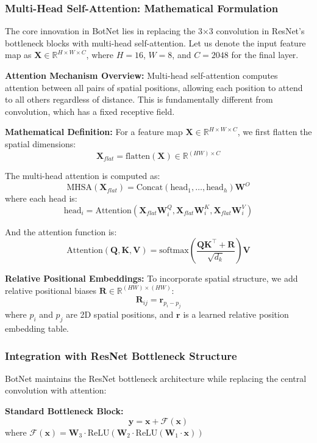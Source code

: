 \documentclass[a4paper,12pt]{article}
\begin{document}
\subsubsection{Multi-Head Self-Attention: Mathematical Formulation}

The core innovation in BotNet lies in replacing the 3×3 convolution in ResNet's bottleneck blocks with multi-head self-attention. Let us denote the input feature map as $\mathbf{X} \in \mathbb{R}^{H \times W \times C}$, where $H=16$, $W=8$, and $C=2048$ for the final layer.

\textbf{Attention Mechanism Overview:}
Multi-head self-attention computes attention between all pairs of spatial positions, allowing each position to attend to all others regardless of distance. This is fundamentally different from convolution, which has a fixed receptive field.

\textbf{Mathematical Definition:}
For a feature map $\mathbf{X} \in \mathbb{R}^{H \times W \times C}$, we first flatten the spatial dimensions:
\[
\mathbf{X}_{flat} = \text{flatten}(\mathbf{X}) \in \mathbb{R}^{(HW) \times C}
\]

The multi-head attention is computed as:
\[
\text{MHSA}(\mathbf{X}_{flat}) = \text{Concat}(\text{head}_1, \dots, \text{head}_h) \mathbf{W}^O
\]
where each head is:
\[
\text{head}_i = \text{Attention}(\mathbf{X}_{flat} \mathbf{W}_i^Q, \mathbf{X}_{flat} \mathbf{W}_i^K, \mathbf{X}_{flat} \mathbf{W}_i^V)
\]

And the attention function is:
\[
\text{Attention}(\mathbf{Q}, \mathbf{K}, \mathbf{V}) = \text{softmax}\left(\frac{\mathbf{Q}\mathbf{K}^\top + \mathbf{R}}{\sqrt{d_k}}\right) \mathbf{V}
\]

\textbf{Relative Positional Embeddings:}
To incorporate spatial structure, we add relative positional biases $\mathbf{R} \in \mathbb{R}^{(HW) \times (HW)}$:
\[
\mathbf{R}_{ij} = \mathbf{r}_{p_i - p_j}
\]
where $p_i$ and $p_j$ are 2D spatial positions, and $\mathbf{r}$ is a learned relative position embedding table.

\subsubsection{Integration with ResNet Bottleneck Structure}

BotNet maintains the ResNet bottleneck architecture while replacing the central convolution with attention:

\textbf{Standard Bottleneck Block:}
\[
\mathbf{y} = \mathbf{x} + \mathcal{F}(\mathbf{x})
\]
where $\mathcal{F}(\mathbf{x}) = \mathbf{W}_3 \cdot \text{ReLU}(\mathbf{W}_2 \cdot \text{ReLU}(\mathbf{W}_1 \cdot \mathbf{x}))$
\end{document}
